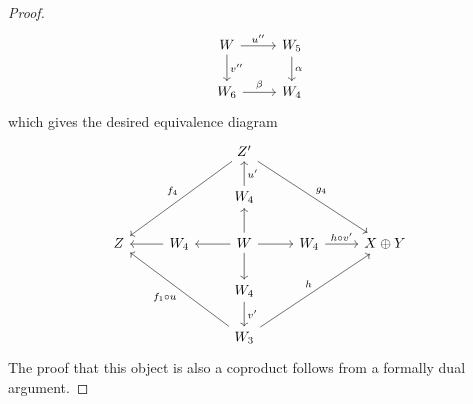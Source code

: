 \documentclass[dissertation.tex]{subfiles}
\begin{document}
\begin{lem}
\begin{proof}
$$\begin{tikzcd}
      W \arrow{r}{u^{\prime\prime}}\arrow{d}{v^{\prime\prime}} & W_5\arrow{d}{\alpha}\\
      W_6\arrow{r}{\beta} & W_4
    \end{tikzcd}$$
    which gives the desired equivalence diagram
    $$\begin{tikzcd}
      & & Z^\prime \arrow[swap]{lldd}{f_4}\arrow{rrdd}{g_4}\\
      & & W_4\arrow[swap]{u}{u^\prime}\\
      Z & W_4 \arrow{l}& W\arrow{l}\arrow{u}\arrow{d}\arrow{r} & W_4\arrow{r}{h \circ v^\prime} & X \oplus Y\\
      & & W_4\arrow{d}{v^\prime}\\
      & & W_3 \arrow{uull}{f_1 \circ u}\arrow{uurr}{h}
    \end{tikzcd}$$
    The proof that this object is also a coproduct follows from a formally dual argument.
  \end{proof}
\end{lem}
\end{document}
